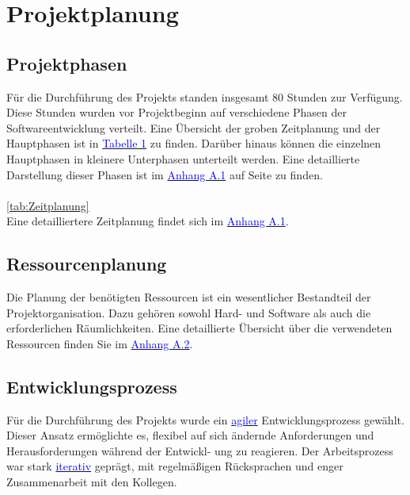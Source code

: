 
\section{Projektplanung} 
\label{sec:Projektplanung}

\subsection{Projektphasen}
\label{sec:Projektphasen}

Für die Durchführung des Projekts standen insgesamt 80 Stunden zur Verfügung. Diese Stunden wurden vor Projektbeginn
auf verschiedene Phasen der Softwareentwicklung verteilt. Eine Übersicht der groben Zeitplanung und der Hauptphasen ist in
\hyperref[tab:Zeitplanung]{\textcolor{blue}{Tabelle 1}} zu finden. Darüber hinaus können die einzelnen Hauptphasen in kleinere Unterphasen unterteilt werden.
Eine detaillierte Darstellung dieser Phasen ist im \hyperref[app:Zeitplanung]{\textcolor{blue}{Anhang A.1}} auf Seite \textcolor{blue}{\pageref{app:Zeitplanung}}
zu finden.

\paragraph{}
\ref{tab:Zeitplanung}
\\
Eine detailliertere Zeitplanung findet sich im \hyperref[app:Zeitplanung]{\textcolor{blue}{Anhang A.1}}.

\subsection{Ressourcenplanung}
\label{sec:Ressourcenplanung}

Die Planung der benötigten Ressourcen ist ein wesentlicher Bestandteil der Projektorganisation. Dazu gehören sowohl Hard- und Software als auch die erforderlichen Räumlichkeiten. Eine detaillierte Übersicht über die verwendeten Ressourcen finden Sie im \hyperref[app:Ressourcen]{\textcolor{blue}{Anhang A.2}}. 

\subsection{Entwicklungsprozess}
\label{sec:Entwicklungsprozess}

Für die Durchführung des Projekts wurde ein \hyperlink{agil}{\textcolor{blue}{agiler}} Entwicklungsprozess gewählt. Dieser Ansatz ermöglichte es, flexibel auf sich ändernde Anforderungen und Herausforderungen während der Entwickl-
ung zu reagieren. Der Arbeitsprozess war stark \hyperlink{iterativ}{\textcolor{blue}{iterativ}} geprägt, mit regelmäßigen Rücksprachen und enger Zusammenarbeit mit den Kollegen.


